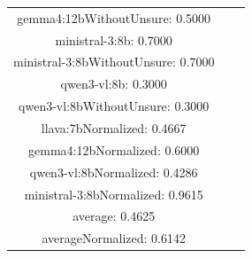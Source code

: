 \documentclass[a4paper]{article}
\begin{document}
\begin{tabular}{ccc}
gemma4:12bWithoutUnsure: 0.5000 \\ ministral-3:8b: 0.7000 \\ ministral-3:8bWithoutUnsure: 0.7000 \\ qwen3-vl:8b: 0.3000 \\ qwen3-vl:8bWithoutUnsure: 0.3000 \\ llava:7bNormalized: 0.4667 \\ gemma4:12bNormalized: 0.6000 \\ qwen3-vl:8bNormalized: 0.4286 \\ ministral-3:8bNormalized: 0.9615 \\ average: 0.4625 \\ averageNormalized: 0.6142 \end{minipage}\\
\end{tabular}

\vspace{5mm}
\end{document}
